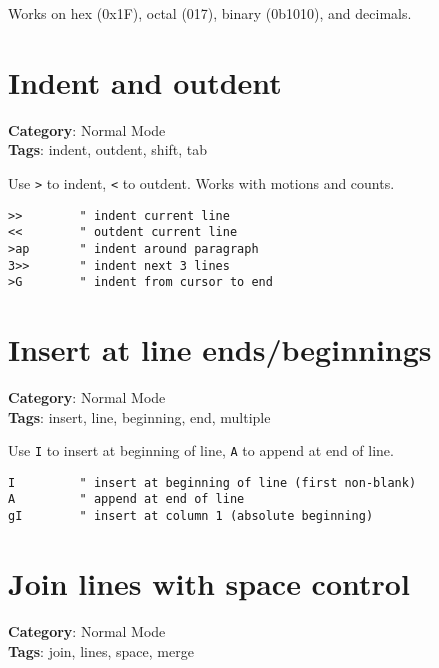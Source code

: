 {{{{{{{{{Works on hex (0x1F), octal (017), binary (0b1010), and decimals.

\section{Indent and outdent}

\textbf{Category}: Normal Mode\\ \textbf{Tags}: indent, outdent, shift, tab
\vspace{0.5cm}

Use {\footnotesize \Verb§>§} to indent, {\footnotesize \Verb§<§} to outdent. Works with motions and counts.

\begin{Exa*}{}
\begin{Verbatim}[fontsize=\footnotesize, breaklines, breakanywhere]
>>        " indent current line
<<        " outdent current line
>ap       " indent around paragraph
3>>       " indent next 3 lines
>G        " indent from cursor to end
\end{Verbatim}
\end{Exa*}

\section{Insert at line ends/beginnings}

\textbf{Category}: Normal Mode\\ \textbf{Tags}: insert, line, beginning, end, multiple
\vspace{0.5cm}

Use {\footnotesize \Verb§I§} to insert at beginning of line, {\footnotesize \Verb§A§} to append at end of line.

\begin{Exa*}{}
\begin{Verbatim}[fontsize=\footnotesize, breaklines, breakanywhere]
I         " insert at beginning of line (first non-blank)
A         " append at end of line
gI        " insert at column 1 (absolute beginning)
\end{Verbatim}
\end{Exa*}

\section{Join lines with space control}

\textbf{Category}: Normal Mode\\ \textbf{Tags}: join, lines, space, merge
\vspace{0.5cm}

}}}}}}}}}
